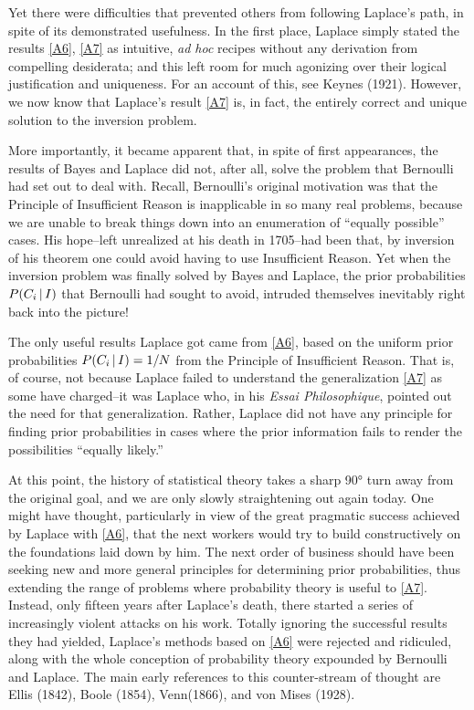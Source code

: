 Yet there were difficulties that prevented others from following Laplace's path, in spite of its demonstrated usefulness.
In the first place, Laplace simply stated the results \eqref{A6}, \eqref{A7} as intuitive, \emph{ad hoc} recipes without any derivation from compelling desiderata; and this left room for much agonizing over their logical justification and uniqueness.
For an account of this, see Keynes (\cite{keynes}{1921}).
However, we now know that Laplace's result \eqref{A7} is, in fact, the entirely correct and unique solution to the inversion problem.

More importantly, it became apparent that, in spite of first appearances, the results of Bayes and Laplace did not, after all, solve the problem that Bernoulli had set out to deal with.
Recall, Bernoulli's original motivation was that the Principle of Insufficient Reason is inapplicable in so many real problems, because we are unable to break things down into an enumeration of ``equally possible'' cases.
His hope--left unrealized at his death in 1705--had been that, by inversion of his theorem one could avoid having to use Insufficient Reason.
Yet when the inversion problem was finally solved by Bayes and Laplace, the prior probabilities $P(C_i \,\vert\, I)$ that Bernoulli had sought to avoid, intruded themselves inevitably right back into the picture!

The only useful results Laplace got came from \eqref{A6}, based on the uniform prior probabilities $P(C_i\,\vert\, I) = 1/N$ from the Principle of Insufficient Reason.
That is, of course, not because Laplace failed to understand the generalization \eqref{A7} as some have charged--it was Laplace who, in his \emph{Essai Philosophique}, pointed out the need for that generalization.
Rather, Laplace did not have any principle for finding prior probabilities in cases where the prior information fails to render the possibilities ``equally likely.''

At this point, the history of statistical theory takes a sharp 90° turn away from the original goal, and we are only slowly straightening out again today.
One might have thought, particularly in view of the great pragmatic success achieved by Laplace with \eqref{A6}, that the next workers would try to build constructively on the foundations laid down by him.
The next order of business should have been seeking new and more general principles for determining prior probabilities, thus extending the range of problems where probability theory is useful to \eqref{A7}.
Instead, only fifteen years after Laplace's death, there started a series of increasingly violent attacks on his work.
Totally ignoring the successful results they had yielded, Laplace's methods based on \eqref{A6} were rejected and ridiculed, along with the whole conception of probability theory expounded by Bernoulli and Laplace.
The main early references to this counter-stream of thought are Ellis (\cite{ellis}{1842}), Boole (\cite{boole}{1854}), Venn(\cite{venn}{1866}), and von Mises (\cite{mises}{1928}).


